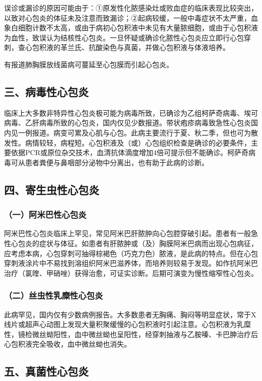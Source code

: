 误诊或漏诊的原因可能由于：①原发性化脓感染灶或败血症的临床表现比较突出，以致对心包炎的体征未及注意而致漏诊；②起病较缓，一般中毒症状不太严重，血象白细胞计数不太高，或由于病初心包积液中未见有大量脓细胞，或由于心包积液为血性，致误认为结核性心包炎。一旦怀疑或确诊化脓性心包炎应立即行心包穿刺，查心包积液的革兰氏、抗酸染色与真菌，并做心包积液与体液培养。

有报道肺胸膜放线菌病可蔓延至心包膜而引起心包炎。

\subsection{三、病毒性心包炎}

临床上大多数非特异性心包炎极可能为病毒所致，已确诊为乙组柯萨奇病毒、埃可病毒、乙肝病毒所致的心包炎，国内仅见少数报道。带状疱疹病毒致急性心包炎国内见一例报道。病变可累及心肌与心包。此病主要流行于夏、秋二季，但也可为散发性。病情较轻，病程短。心包积液及（或）心包组织检查是确诊的必要条件，主要依据PCR或原位杂交技术，血清抗体滴度增加4倍可提示但不能确诊。柯萨奇病毒可从患者粪便与鼻咽部分泌物中分离出，也有助于此病的诊断。

\subsection{四、寄生虫性心包炎}

\subsubsection{（一）阿米巴性心包炎}

阿米巴性心包炎临床上罕见，常见阿米巴肝脓肿向心包腔穿破引起。患者有一般急性心包炎的症状与体征。如患者有肝脓肿或（及）胸膜阿米巴病而出现心包病征，应考虑本病，心包穿刺可抽得棕褐色（巧克力色）脓液，是此病的特点。但在心包穿刺液涂片中不易找到溶组织阿米巴滋养体，而培养则较易于发现。如作抗阿米巴治疗（氯喹、甲硝唑）获得治愈，可证实诊断。后期可演变为慢性缩窄性心包炎。

\subsubsection{（二）丝虫性乳糜性心包炎}

此病罕见，国内仅有少数病例报告。大多数患者无胸痛、胸闷等明显症状，常于X线片或超声心动图上发现大量积聚缓慢的心包积液时引起注意。心包积液为乳糜性，镜检微丝蚴阳性，血中微丝蚴也呈阳性，经穿刺抽液与乙胺嗪、卡巴胂治疗后心包积液完全吸收，血中微丝蚴也消失。

\subsection{五、真菌性心包炎}

